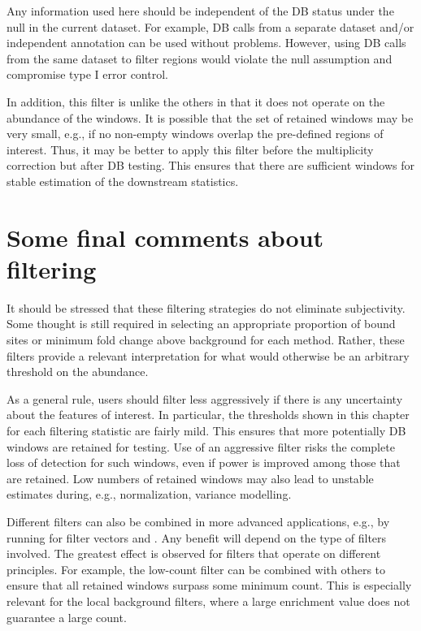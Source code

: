 \documentclass{report}\usepackage[]{graphicx}\usepackage[usenames,dvipsnames]{color}
\begin{document}
Any information used here should be independent of the DB status under the null in the current dataset. 
For example, DB calls from a separate dataset and/or independent annotation can be used without problems. 
However, using DB calls from the same dataset to filter regions would violate the null assumption and compromise type I error control.

In addition, this filter is unlike the others in that it does not operate on the abundance of the windows. 
It is possible that the set of retained windows may be very small, e.g., if no non-empty windows overlap the pre-defined regions of interest.
Thus, it may be better to apply this filter before the multiplicity correction but after DB testing.
This ensures that there are sufficient windows for stable estimation of the downstream statistics.

\section{Some final comments about filtering}
It should be stressed that these filtering strategies do not eliminate subjectivity.
Some thought is still required in selecting an appropriate proportion of bound sites or minimum fold change above background for each method.
Rather, these filters provide a relevant interpretation for what would otherwise be an arbitrary threshold on the abundance.

As a general rule, users should filter less aggressively if there is any uncertainty about the features of interest.
In particular, the thresholds shown in this chapter for each filtering statistic are fairly mild.
This ensures that more potentially DB windows are retained for testing.
Use of an aggressive filter risks the complete loss of detection for such windows, even if power is improved among those that are retained.
Low numbers of retained windows may also lead to unstable estimates during, e.g., normalization, variance modelling.

Different filters can also be combined in more advanced applications, e.g., by running  for filter vectors  and .
Any benefit will depend on the type of filters involved.
The greatest effect is observed for filters that operate on different principles.
For example, the low-count filter can be combined with others to ensure that all retained windows surpass some minimum count.
This is especially relevant for the local background filters, where a large enrichment value does not guarantee a large count.
\end{document}
